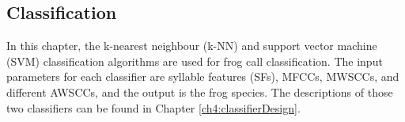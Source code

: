 \subsection{Classification}
In this chapter, the k-nearest neighbour (k-NN) and support vector machine (SVM) classification algorithms are used for frog call classification. The input parameters for each classifier are syllable features (SFs), MFCCs, MWSCCs, and different AWSCCs, and the output is the frog species.
The descriptions of those two classifiers can be found in Chapter \ref{ch4:classifierDesign}.

%
